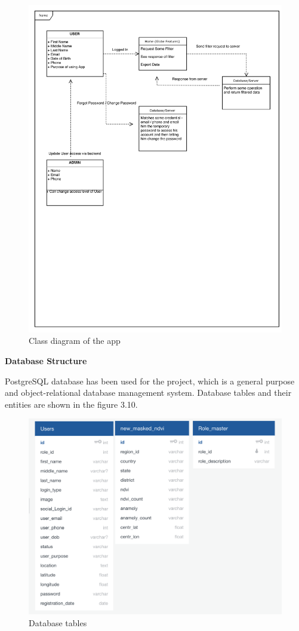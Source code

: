     \begin{figure}[H]
            \centering
            \includegraphics[width=0.8\linewidth]{figures/ch3/classdiagram.png}
            \caption{\label{fig:class_diag} Class diagram of the app}
    \end{figure}
    
    \newpage

 \centerline{\textbf{Database Structure}}    
  PostgreSQL database has been used for the project, which is a general purpose and object-relational database management system. 
  Database tables and their entities are shown in the figure 3.10.
  
  \begin{figure}[H]
            \centering
            \includegraphics[width=1.0\linewidth]{figures/ch3/database_structure.png}
            \caption{\label{fig:database_structure} Database tables}
    \end{figure}
    
    




